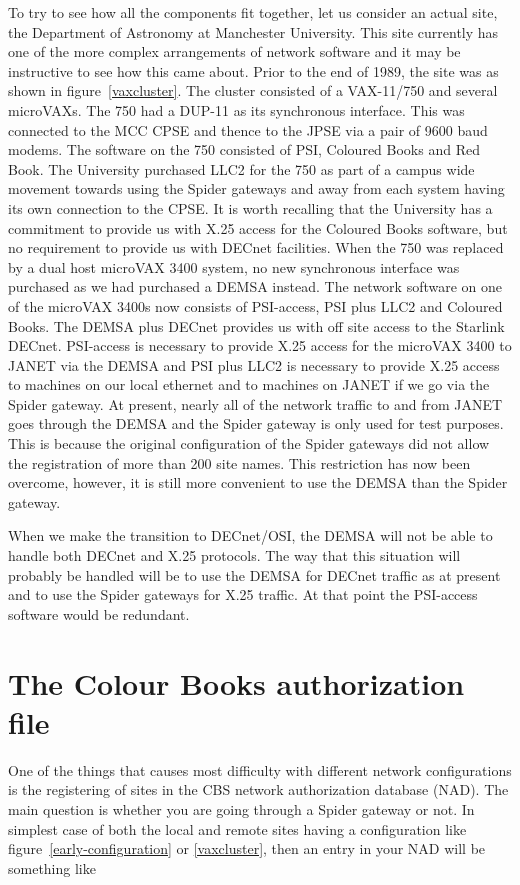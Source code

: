 To try to see how all the components fit together, let us consider an actual
site, the Department of Astronomy at Manchester University. This site currently
has one of the more complex arrangements of network software and it may be
instructive to see how this came about. Prior to the end of 1989, the site was
as shown in figure~\ref{vaxcluster}. The cluster consisted of a VAX-11/750 and
several microVAXs. The 750 had a DUP-11 as its synchronous interface. This was
connected to the MCC CPSE and thence to the JPSE via a pair of 9600 baud
modems. The software on the 750 consisted of PSI, Coloured Books and Red Book.
The University purchased LLC2 for the 750 as part of a campus wide movement
towards using the Spider gateways and away from each system having its own
connection to the CPSE. It is worth recalling that the University has a
commitment to provide us with X.25 access for the Coloured Books software, but
no requirement to provide us with DECnet facilities. When the 750 was replaced
by a dual host microVAX 3400 system, no new synchronous interface was purchased
as we had purchased a DEMSA instead. The network software on one of the
microVAX 3400s now consists of PSI-access, PSI plus LLC2 and Coloured Books.
The DEMSA plus DECnet provides us with off site access to the Starlink DECnet.
PSI-access is necessary to provide X.25 access for the microVAX 3400 to JANET
via the DEMSA and PSI plus LLC2 is necessary to provide X.25 access to machines
on our local ethernet and to machines on JANET if we go via the Spider gateway.
At present, nearly all of the network traffic to and from JANET goes through
the DEMSA and the Spider gateway is only used for test purposes. This is
because the original configuration of the Spider gateways did not allow the
registration of more than 200 site names. This restriction has now been
overcome, however, it is still more convenient to use the DEMSA than the Spider
gateway. 

When we make the transition to DECnet/OSI, the DEMSA will not be able to
handle both DECnet and X.25 protocols. The way that this situation will
probably be handled will be to use the DEMSA for DECnet traffic as at present
and to use the Spider gateways for X.25 traffic. At that point the PSI-access
software would be redundant. 

\section{The Colour Books authorization file}

One of the things that causes most difficulty with different network
configurations is the registering of sites in the CBS network authorization
database (NAD). The main question is whether you are going through a Spider
gateway or not. In simplest case of both the local and remote sites having a
configuration like figure~\ref{early-configuration} or \ref{vaxcluster}, then
an entry in your NAD will be something like

